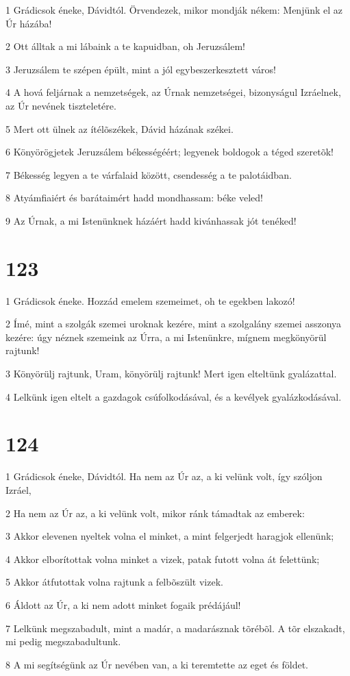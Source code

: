 \par 1 Grádicsok éneke, Dávidtól. Örvendezek, mikor mondják nékem: Menjünk el az Úr házába!
\par 2 Ott álltak a mi lábaink a te kapuidban, oh Jeruzsálem!
\par 3 Jeruzsálem te szépen épült, mint a jól egybeszerkesztett város!
\par 4 A hová feljárnak a nemzetségek, az Úrnak nemzetségei, bizonyságul Izráelnek, az Úr nevének tiszteletére.
\par 5 Mert ott ülnek az ítélõszékek, Dávid házának székei.
\par 6 Könyörögjetek Jeruzsálem békességéért; legyenek boldogok a téged szeretõk!
\par 7 Békesség legyen a te várfalaid között, csendesség a te palotáidban.
\par 8 Atyámfiaiért és barátaimért hadd mondhassam: béke veled!
\par 9 Az Úrnak, a mi Istenünknek házáért hadd kivánhassak jót tenéked!

\chapter{123}

\par 1 Grádicsok éneke. Hozzád emelem szemeimet, oh te egekben lakozó!
\par 2 Ímé, mint a szolgák szemei uroknak kezére, mint a szolgalány szemei asszonya kezére: úgy néznek szemeink az Úrra, a mi Istenünkre, mígnem megkönyörül rajtunk!
\par 3 Könyörülj rajtunk, Uram, könyörülj rajtunk! Mert igen elteltünk gyalázattal.
\par 4 Lelkünk igen eltelt a gazdagok csúfolkodásával, és a kevélyek gyalázkodásával.

\chapter{124}

\par 1 Grádicsok éneke, Dávidtól. Ha nem az Úr az, a ki velünk volt, így szóljon Izráel,
\par 2 Ha nem az Úr az, a ki velünk volt, mikor ránk támadtak az emberek:
\par 3 Akkor elevenen nyeltek volna el minket, a mint felgerjedt haragjok ellenünk;
\par 4 Akkor elborítottak volna minket a vizek, patak futott volna át felettünk;
\par 5 Akkor átfutottak volna rajtunk a felbõszült vizek.
\par 6 Áldott az Úr, a ki nem adott minket fogaik prédájául!
\par 7 Lelkünk megszabadult, mint a madár, a madarásznak tõrébõl. A tõr elszakadt, mi pedig megszabadultunk.
\par 8 A mi segítségünk az Úr nevében van, a ki teremtette az eget és földet.

